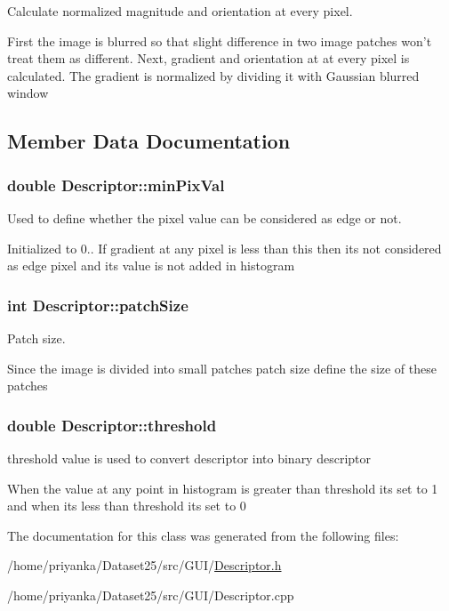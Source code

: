 \-Calculate normalized magnitude and orientation at every pixel. 

\-First the image is blurred so that slight difference in two image patches won't treat them as different. \-Next, gradient and orientation at at every pixel is calculated. \-The gradient is normalized by dividing it with \-Gaussian blurred window 

\subsection{\-Member \-Data \-Documentation}
\hypertarget{classDescriptor_a64392290391afd9000a085710513c381}{
\subsubsection[{min\-Pix\-Val}]{\setlength{\rightskip}{0pt plus 5cm}double {\bf \-Descriptor\-::min\-Pix\-Val}}}\label{classDescriptor_a64392290391afd9000a085710513c381}


\-Used to define whether the pixel value can be considered as edge or not. 

\-Initialized to 0.. \-If gradient at any pixel is less than this then its not considered as edge pixel and its value is not added in histogram \hypertarget{classDescriptor_a1ae195a424d69f9e1d754fcceee3c0ad}{
\subsubsection[{patch\-Size}]{\setlength{\rightskip}{0pt plus 5cm}int {\bf \-Descriptor\-::patch\-Size}}}\label{classDescriptor_a1ae195a424d69f9e1d754fcceee3c0ad}


\-Patch size. 

\-Since the image is divided into small patches patch size define the size of these patches \hypertarget{classDescriptor_a17990364a2abbf2c531a2b644be57bf4}{
\subsubsection[{threshold}]{\setlength{\rightskip}{0pt plus 5cm}double {\bf \-Descriptor\-::threshold}}}\label{classDescriptor_a17990364a2abbf2c531a2b644be57bf4}


threshold value is used to convert descriptor into binary descriptor 

\-When the value at any point in histogram is greater than threshold its set to 1 and when its less than threshold its set to 0 

\-The documentation for this class was generated from the following files\-:\begin{DoxyCompactItemize}
\item 
/home/priyanka/\-Dataset25/src/\-G\-U\-I/\hyperlink{Descriptor_8h}{\-Descriptor.\-h}\item 
/home/priyanka/\-Dataset25/src/\-G\-U\-I/\-Descriptor.\-cpp\end{DoxyCompactItemize}
